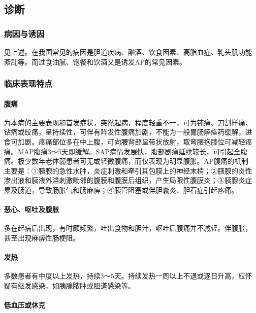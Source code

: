 \subsection{诊断}

\subsubsection{病因与诱因}

见上述。在我国常见的病因是胆道疾病、酗酒、饮食因素、高脂血症、乳头肌功能紊乱等。而过食油腻、饱餐和饮酒又是诱发AP的常见因素。

\subsubsection{临床表现特点}

\paragraph{腹痛}

为本病的主要表现和首发症状，突然起病，程度轻重不一，可为钝痛、刀割样痛、钻痛或绞痛，呈持续性，可伴有阵发性腹痛加剧，不能为一般胃肠解痉药缓解，进食可加剧。疼痛部位多在中上腹，可向腰背部呈带状放射，取弯腰抱膝位可减轻疼痛。MAP腹痛3～5天即缓解。SAP病情发展快，腹部剧痛延续较长，可引起全腹痛。极少数年老体弱患者可无或轻微腹痛，而仅表现为明显腹胀。AP腹痛的机制主要是：①胰腺的急性水肿，炎症刺激和牵引其包膜上的神经末梢；②胰腺的炎性渗出液和胰液外溢刺激毗邻的腹膜和腹膜后组织，产生局限性腹膜炎；③胰腺炎症累及肠道，导致肠胀气和肠麻痹；④胰管阻塞或伴胆囊炎、胆石症引起疼痛。

\paragraph{恶心、呕吐及腹胀}

多在起病后出现，有时颇频繁，吐出食物和胆汁，呕吐后腹痛并不减轻。伴腹胀，甚至出现麻痹性肠梗阻。

\paragraph{发热}

多数患者有中度以上发热，持续3～5天。持续发热一周以上不退或逐日升高，应怀疑有继发感染，如胰腺脓肿或胆道感染等。

\paragraph{低血压或休克}

